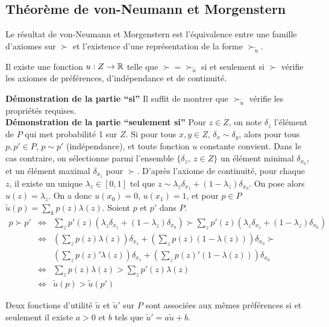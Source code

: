 \subsection{Théorème de von-Neumann et Morgenstern}
Le résultat de von-Neumann et Morgenstern est l'équivalence entre
une famille d'axiomes sur $\succ$ et l'existence d'une
représentation de la forme $\succ_{\tilde u}$.
%
\begin{proposition}
Il existe une fonction $u:Z\to \mathbb R$ telle que $\succ =
\succ_{\tilde u}$ si et seulement si $\succ$ vérifie les axiomes
de préférences, d'indépendance et de continuité.
\end{proposition}
%
{\bf Démonstration de la partie ``si''} Il suffit de montrer que
$\succ_{\tilde u}$ vérifie les propriétés requises. \\
{\bf Démonstration de la partie ``seulement si''} Pour $z\in Z$,
on note $\delta_z$ l'élément de $P$ qui met probabilité 1 sur $Z$.
Si pour tous $x,y\in Z$, $\delta_x\sim\delta_y$, alors pour tous
$p,p'\in P$, $p\sim p'$ (indépendance), et toute fonction $u$
constante convient. Dans le cas contraire, on sélectionne parmi
l'ensemble $\{\delta_z,\ z\in Z\}$ un élément minimal
$\delta_{x_0}$, et un élément maximal $\delta_{x_1}$ pour $\succ$.
D'après l'axiome de continuité, pour chaque $z$, il existe un
unique $\lambda_z\in[0,1]$ tel que $z\sim\lambda_z
\delta_{x_1}+(1-\lambda_z)\delta_{x_0}$. On pose alors
$u(z)=\lambda_z$. On a donc $u(x_0)=0$, $u(x_1)=1$, et pour $p\in
P$ $\tilde u(p)= \sum_k p(z)\lambda(z)$. Soient $p$ et
$p'$ dans $P$.%
\begin{eqnarray*}
p\succ p' & \Leftrightarrow & \sum_z p'(z)(\lambda_z
\delta_{x_1}+(1-\lambda_z)\delta_{x_0}) \succ \sum_z
p'(z)(\lambda_z \delta_{x_1}+(1-\lambda_z)\delta_{x_0})\\
& \Leftrightarrow & (\sum_z p(z)\lambda(z))\delta_{x_1}+(\sum_z
p(z)(1-\lambda(z)))\delta_{x_0} \succ \\
&&(\sum_z p(z)'\lambda(z))\delta_{x_1}+(\sum_z
p(z)'(1-\lambda(z)))\delta_{x_0}\\
& \Leftrightarrow & \sum_z  p(z)\lambda(z) > \sum_z p'(z)\lambda(z)\\
& \Leftrightarrow & \tilde u(p) > \tilde u(p')
\end{eqnarray*}
\begin{proposition}
Deux fonctions d'utilité $\tilde u$ et $\tilde u'$ sur $P$ sont
associées aux m\^emes préférences si et seulement il existe $a>0$
et $b$ tels que $\tilde u' = a\tilde u+b$.
\end{proposition}
